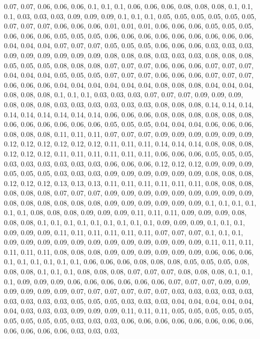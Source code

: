 \documentclass[
  ,man]{apa6}
\begin{document}
0.07, 0.07, 0.06, 0.06, 0.06, 0.1, 0.1, 0.1, 0.06, 0.06, 0.06, 0.08, 0.08, 0.08, 0.1, 0.1, 0.1, 0.03, 0.03, 0.03, 0.09, 0.09, 0.09, 0.1, 0.1, 0.1, 0.05, 0.05, 0.05, 0.05, 0.05, 0.05, 0.07, 0.07, 0.07, 0.06, 0.06, 0.06, 0.01, 0.01, 0.01, 0.06, 0.06, 0.06, 0.05, 0.05, 0.05, 0.06, 0.06, 0.06, 0.05, 0.05, 0.05, 0.06, 0.06, 0.06, 0.06, 0.06, 0.06, 0.06, 0.06, 0.06, 0.04, 0.04, 0.04, 0.07, 0.07, 0.07, 0.05, 0.05, 0.05, 0.06, 0.06, 0.06, 0.03, 0.03, 0.03, 0.09, 0.09, 0.09, 0.09, 0.09, 0.09, 0.08, 0.08,
0.08, 0.03, 0.03, 0.03, 0.08, 0.08, 0.08, 0.05, 0.05, 0.05, 0.08, 0.08, 0.08, 0.07, 0.07, 0.07, 0.06, 0.06, 0.06, 0.07, 0.07, 0.07, 0.04, 0.04, 0.04, 0.05, 0.05, 0.05, 0.07, 0.07, 0.07, 0.06, 0.06, 0.06, 0.07, 0.07, 0.07, 0.06, 0.06, 0.06, 0.04, 0.04, 0.04, 0.04, 0.04, 0.04, 0.08, 0.08, 0.08, 0.04, 0.04, 0.04, 0.08, 0.08, 0.08, 0.1, 0.1, 0.1, 0.03, 0.03, 0.03, 0.07, 0.07, 0.07, 0.09, 0.09, 0.09, 0.08, 0.08, 0.08, 0.03, 0.03, 0.03, 0.03, 0.03, 0.03, 0.08, 0.08, 0.08, 0.14, 0.14, 0.14, 0.14, 0.14,
0.14, 0.14, 0.14, 0.14, 0.06, 0.06, 0.06, 0.08, 0.08, 0.08, 0.08, 0.08, 0.08, 0.06, 0.06, 0.06, 0.06, 0.06, 0.06, 0.05, 0.05, 0.05, 0.04, 0.04, 0.04, 0.06, 0.06, 0.06, 0.08, 0.08, 0.08, 0.11, 0.11, 0.11, 0.07, 0.07, 0.07, 0.09, 0.09, 0.09, 0.09, 0.09, 0.09, 0.12, 0.12, 0.12, 0.12, 0.12, 0.12, 0.11, 0.11, 0.11, 0.14, 0.14, 0.14, 0.08, 0.08, 0.08, 0.12, 0.12, 0.12, 0.11, 0.11, 0.11, 0.11, 0.11, 0.11, 0.06, 0.06, 0.06, 0.05, 0.05, 0.05, 0.03, 0.03, 0.03, 0.03, 0.03, 0.03, 0.06, 0.06, 0.06, 0.12, 0.12,
0.12, 0.09, 0.09, 0.09, 0.05, 0.05, 0.05, 0.03, 0.03, 0.03, 0.09, 0.09, 0.09, 0.09, 0.09, 0.09, 0.08, 0.08, 0.08, 0.12, 0.12, 0.12, 0.13, 0.13, 0.13, 0.11, 0.11, 0.11, 0.11, 0.11, 0.11, 0.08, 0.08, 0.08, 0.08, 0.08, 0.08, 0.07, 0.07, 0.07, 0.09, 0.09, 0.09, 0.09, 0.09, 0.09, 0.09, 0.09, 0.09, 0.08, 0.08, 0.08, 0.08, 0.08, 0.08, 0.09, 0.09, 0.09, 0.09, 0.09, 0.09, 0.1, 0.1, 0.1, 0.1, 0.1, 0.1, 0.08, 0.08, 0.08, 0.09, 0.09, 0.09, 0.11, 0.11, 0.11, 0.09, 0.09, 0.09, 0.08, 0.08, 0.08, 0.1, 0.1, 0.1,
0.1, 0.1, 0.1, 0.1, 0.1, 0.1, 0.09, 0.09, 0.09, 0.1, 0.1, 0.1, 0.09, 0.09, 0.09, 0.11, 0.11, 0.11, 0.11, 0.11, 0.11, 0.07, 0.07, 0.07, 0.1, 0.1, 0.1, 0.09, 0.09, 0.09, 0.09, 0.09, 0.09, 0.09, 0.09, 0.09, 0.09, 0.09, 0.09, 0.11, 0.11, 0.11, 0.11, 0.11, 0.11, 0.08, 0.08, 0.08, 0.09, 0.09, 0.09, 0.09, 0.09, 0.09, 0.06, 0.06, 0.06, 0.1, 0.1, 0.1, 0.1, 0.1, 0.1, 0.06, 0.06, 0.06, 0.08, 0.08, 0.08, 0.05, 0.05, 0.05, 0.08, 0.08, 0.08, 0.1, 0.1, 0.1, 0.08, 0.08, 0.08, 0.07, 0.07, 0.07, 0.08, 0.08, 0.08,
0.1, 0.1, 0.1, 0.09, 0.09, 0.09, 0.06, 0.06, 0.06, 0.06, 0.06, 0.06, 0.07, 0.07, 0.07, 0.09, 0.09, 0.09, 0.09, 0.09, 0.09, 0.07, 0.07, 0.07, 0.07, 0.07, 0.07, 0.03, 0.03, 0.03, 0.03, 0.03, 0.03, 0.03, 0.03, 0.03, 0.05, 0.05, 0.05, 0.03, 0.03, 0.03, 0.04, 0.04, 0.04, 0.04, 0.04, 0.04, 0.03, 0.03, 0.03, 0.09, 0.09, 0.09, 0.11, 0.11, 0.11, 0.05, 0.05, 0.05, 0.05, 0.05, 0.05, 0.05, 0.05, 0.05, 0.03, 0.03, 0.03, 0.06, 0.06, 0.06, 0.06, 0.06, 0.06, 0.06, 0.06, 0.06, 0.06, 0.06, 0.06, 0.03, 0.03, 0.03,
\end{document}
